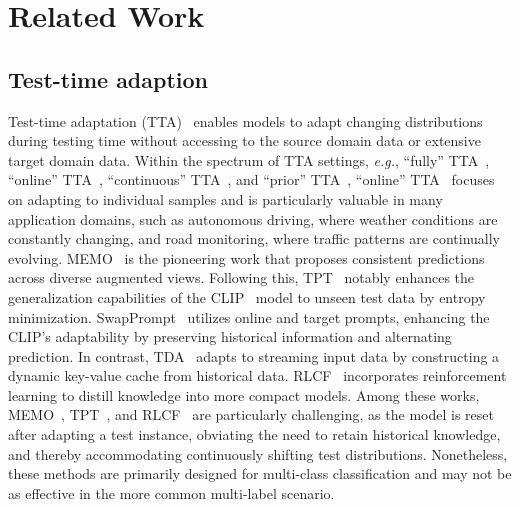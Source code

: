 \section{Related Work}
\subsection{Test-time adaption}
Test-time adaptation (TTA)~\citep{TTA-MEMO,TTA-TPT,TTA-SwapPrompt,TTA-TDA,TTA-RLCF,TTA-NotEnough,TTA-Adapting,TTA-MODE} enables models to adapt changing distributions during testing time without accessing to the source domain data or extensive target domain data. Within the spectrum of TTA settings, \textit{e.g.}, ``fully'' TTA~\citep{TTA-Tent,TTA-Delta}, ``online'' TTA~\citep{TTA-Stationary,TTA-NotEnough}, ``continuous'' TTA~\citep{TTA-VIDA,TTA-EcoTTA}, and ``prior'' TTA~\citep{TTA-prior-1,TTA-prior-2}, ``online'' TTA~\citep{TTA-TPT,TTA-TDA,TTA-RLCF} focuses on adapting to individual samples and is particularly valuable in many application domains, such as autonomous driving, where weather conditions are constantly changing, and road monitoring, where traffic patterns are continually evolving. MEMO~\citep{TTA-MEMO} is the pioneering work that proposes consistent predictions across diverse augmented views. Following this, TPT~\citep{TTA-TPT} notably enhances the generalization capabilities of the CLIP~\citep{VLMs-Openai-CLIP} model to unseen test data by entropy minimization. SwapPrompt~\citep{TTA-SwapPrompt} utilizes online and target prompts, enhancing the CLIP's adaptability by preserving historical information and alternating prediction. In contrast, TDA~\citep{TTA-TDA} adapts to streaming input data by constructing a dynamic key-value cache from historical data. RLCF~\citep{TTA-RLCF} incorporates reinforcement learning to distill knowledge into more compact models. Among these works, MEMO~\citep{TTA-MEMO}, TPT~\citep{TTA-TPT}, and RLCF~\citep{TTA-RLCF} are particularly challenging, as the model is reset after adapting a test instance, obviating the need to retain historical knowledge, and thereby accommodating continuously shifting test distributions. Nonetheless, these methods are primarily designed for multi-class classification and may not be as effective in the more common multi-label scenario.

